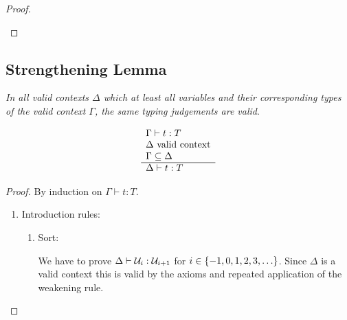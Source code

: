 \begin{theorem}
\begin{proof}
\begin{enumerate}
        \end{enumerate}
    \end{proof}
\end{theorem}







\subsection{Strengthening Lemma}

\begin{lemma}
    \label{Strengthening}
    \emph{In all valid contexts $\Delta$ which at least all variables and their
    corresponding types of the valid context $\Gamma$, the same typing
    judgements are valid}.

    $$
    \begin{array}{l} 
        \Gamma \vdash t : T
        \\
        \Delta \text{ valid context}
        \\
        \Gamma \subseteq \Delta
     \\ \hline 
        \Delta \vdash t: T
    \end{array}
    $$

    \begin{proof} By induction on $\Gamma \vdash t: T$.
        {
            \newcommand{\subgoal}[4] {
                \begin{array}{l}
                    {#1} \text { valid context}
                    \\
                    {#2} \subseteq {#1}
                    \\
                    \hline
                    {#1} \vdash {#3}: {#4}
                \end{array}
            }
            \newcommand{\goal}[4] {
                \forall #1. \left( {\subgoal{#1}{#2}{#3}{#4}} \right)
            }
        \begin{enumerate}
            \item Introduction rules:
            \begin{enumerate}
                \item Sort:

                We have to prove $\Delta \vdash {\cal U}_i : {\cal U}_{i+1}$ for $i \in
                    {\{-1, 0, 1, 2, 3, \ldots\}}$. Since $\Delta$ is a valid
                    context this is valid by the axioms and repeated application
                    of the weakening rule.


\end{enumerate}
\end{enumerate}}
\end{proof}
\end{lemma}
